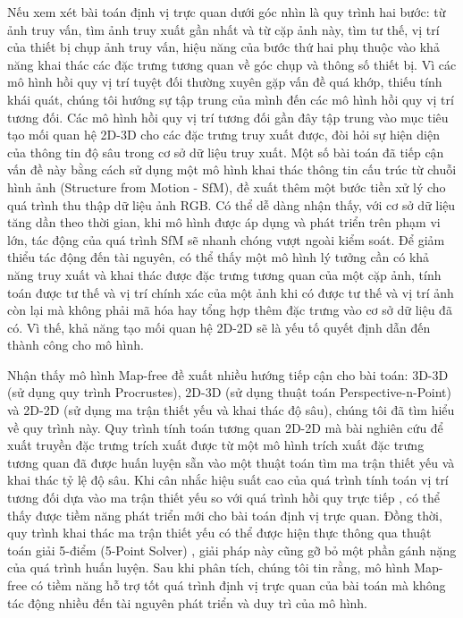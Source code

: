 Nếu xem xét bài toán định vị trực quan dưới góc nhìn là quy trình hai bước: từ ảnh truy vấn, tìm ảnh truy xuất gần nhất và từ cặp ảnh này, tìm tư thế, vị trí của thiết bị chụp ảnh truy vấn, hiệu năng của bước thứ hai phụ thuộc vào khả năng khai thác các đặc trưng tương quan về góc chụp và thông số thiết bị. Vì các mô hình hồi quy vị trí tuyệt đối thường xuyên gặp vấn đề quá khớp, thiếu tính khái quát, chúng tôi hướng sự tập trung của mình đến các mô hình hồi quy vị trí tương đối. Các mô hình hồi quy vị trí tương đối gần đây tập trung vào mục tiêu tạo mối quan hệ 2D-3D cho các đặc trưng truy xuất được, đòi hỏi sự hiện diện của thông tin độ sâu trong cơ sở dữ liệu truy xuất. Một số bài toán đã tiếp cận vấn đề này bằng cách sử dụng một mô hình khai thác thông tin cấu trúc từ chuỗi hình ảnh (Structure from Motion - SfM), đề xuất thêm một bước tiền xử lý cho quá trình thu thập dữ liệu ảnh RGB. Có thể dễ dàng nhận thấy, với cơ sở dữ liệu tăng dần theo thời gian, khi mô hình được áp dụng và phát triển trên phạm vi lớn, tác động của quá trình SfM sẽ nhanh chóng vượt ngoài kiểm soát. Để giảm thiểu tác động đến tài nguyên, có thể thấy một mô hình lý tưởng cần có khả năng truy xuất và khai thác được đặc trưng tương quan của một cặp ảnh, tính toán được tư thế và vị trí chính xác của một ảnh khi có được tư thế và vị trí ảnh còn lại mà không phải mã hóa hay tổng hợp thêm đặc trưng vào cơ sở dữ liệu đã có. Vì thế, khả năng tạo mối quan hệ 2D-2D sẽ là yếu tố quyết định dẫn đến thành công cho mô hình.

Nhận thấy mô hình Map-free \cite{arnold2022mapfree} đề xuất nhiều hướng tiếp cận cho bài toán: 3D-3D (sử dụng quy trình Procrustes), 2D-3D (sử dụng thuật toán Perspective-n-Point) và 2D-2D (sử dụng ma trận thiết yếu và khai thác độ sâu), chúng tôi đã tìm hiểu về quy trình này. Quy trình tính toán tương quan 2D-2D mà bài nghiên cứu để xuất truyền đặc trưng trích xuất được từ một mô hình trích xuất đặc trưng tương quan đã được huấn luyện sẵn vào một thuật toán tìm ma trận thiết yếu và khai thác tỷ lệ độ sâu. Khi cân nhắc hiệu suất cao của quá trình tính toán vị trí tương đối dựa vào ma trận thiết yếu so với quá trình hồi quy trực tiếp \cite{sattler2019understanding}, có thể thấy được tiềm năng phát triển mới cho bài toán định vị trực quan. Đồng thời, quy trình khai thác ma trận thiết yếu có thể được hiện thực thông qua thuật toán giải 5-điểm (5-Point Solver) \cite{nister2004efficient}, giải pháp này cũng gỡ bỏ một phần gánh nặng của quá trình huấn luyện. Sau khi phân tích, chúng tôi tin rằng, mô hình Map-free có tiềm năng hỗ trợ tốt quá trình định vị trực quan của bài toán mà không tác động nhiều đến tài nguyên phát triển và duy trì của mô hình.
